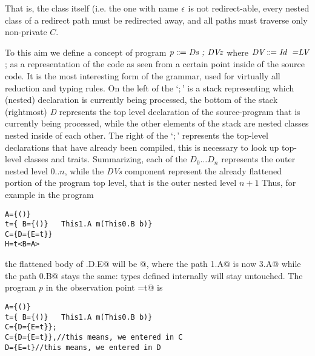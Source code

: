 That is, the class itself (i.e. the one with name $\epsilon$ is not redirect-able, every nested class of a redirect path must be redirected away,
and all paths must traverse only non-private $C$.



\clearpage
{}

To this aim we define a concept of program 
$\textit{p}\Coloneqq\textit{Ds\Q{;} \DVz}$
where 
$\textit{DV}\Coloneqq\textit{\Id\eq{LV}}$; as a representation of 
the code as seen from a certain point inside of the source code. It is the most interesting form of the grammar,
used for virtually all reduction and typing rules. On the left of the `$;$' is a stack representing which (nested) declaration is currently being processed,
the bottom of the stack (rightmost) \textit{D} represents the top level declaration of the source-program that is currently being processed, while the other elements of the stack are nested classes nested inside of each other.
The right of the `$;$' represents the top-level declarations that have already been compiled, this is necessary to look up top-level classes and traits.
Summarizing, each of the $\textit{D}_0\ldots\textit{D}_n$
represents the outer nested level $0..n$, while
the \textit{DVs} component represent the already flattened portion of the program top level, that is 
the outer nested level $n+1$
Thus, for example in the program
\begin{lstlisting}
A={()}
t={ B={()}   This1.A m(This0.B b)}
C={D={E=t}}
H=t<B=A>
\end{lstlisting}
the flattened body of \Q@C.D.E@ will be 
@, where the path
\Q@This1.A@ is now \Q@This3.A@ while the path \Q@This0.B@ stays the same: types defined internally will
stay untouched.
The program $p$ in the observation point \Q@E=t@ is
\begin{lstlisting}
A={()}
t={ B={()}   This1.A m(This0.B b)}
C={D={E=t}};
C={D={E=t}},//this means, we entered in C
D={E=t}//this means, we entered in D
\end{lstlisting}

